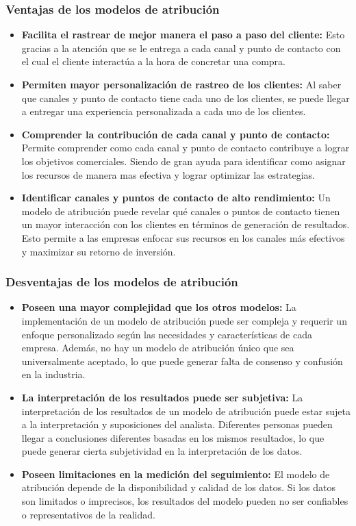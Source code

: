 \subsubsection{Ventajas de los modelos de atribución}
\begin{itemize}
    \item \textbf{Facilita el rastrear de mejor manera el paso a paso del cliente:} Esto gracias a la atención que se le entrega a cada canal y punto de contacto con el cual el cliente interactúa a la hora de concretar una compra.
    \item \textbf{Permiten mayor personalización de rastreo de los clientes:} Al saber que canales y punto de contacto tiene cada uno de los clientes, se puede llegar a entregar una experiencia personalizada a cada uno de los clientes.
    \item \textbf{Comprender la contribución de cada canal y punto de contacto:} Permite comprender como cada canal y punto de contacto contribuye a lograr los objetivos comerciales. Siendo de gran ayuda para identificar como asignar los recursos de manera mas efectiva y lograr optimizar las estrategias.
    \item \textbf{Identificar canales y puntos de contacto de alto rendimiento:} Un modelo de atribución puede revelar qué canales o puntos de contacto tienen un mayor interacción con los clientes en términos de generación de resultados. Esto permite a las empresas enfocar sus recursos en los canales más efectivos y maximizar su retorno de inversión.
\end{itemize}

\subsubsection{Desventajas de los modelos de atribución}
\begin{itemize}
    \item \textbf{Poseen una mayor complejidad que los otros modelos:} La implementación de un modelo de atribución puede ser compleja y requerir un enfoque personalizado según las necesidades y características de cada empresa. Además, no hay un modelo de atribución único que sea universalmente aceptado, lo que puede generar falta de consenso y confusión en la industria.
    \item \textbf{La interpretación de los resultados puede ser subjetiva:} La interpretación de los resultados de un modelo de atribución puede estar sujeta a la interpretación y suposiciones del analista. Diferentes personas pueden llegar a conclusiones diferentes basadas en los mismos resultados, lo que puede generar cierta subjetividad en la interpretación de los datos.
    \item \textbf{Poseen limitaciones en la medición del seguimiento:} El modelo de atribución depende de la disponibilidad y calidad de los datos. Si los datos son limitados o imprecisos, los resultados del modelo pueden no ser confiables o representativos de la realidad.
\end{itemize}